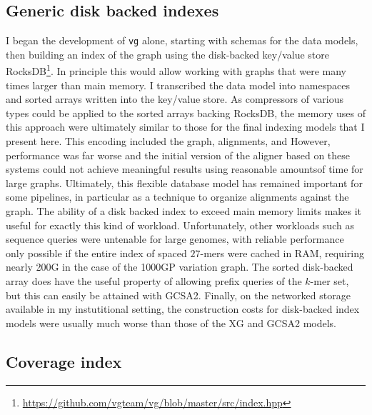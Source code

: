 \subsection{Generic disk backed indexes}
\label{sec:generic_disk_backed_indexes}
I began the development of {\tt vg} alone, starting with schemas for the data models, then building an index of the graph using the disk-backed key/value store RocksDB\footnote{\url{https://github.com/vgteam/vg/blob/master/src/index.hpp}}.
In principle this would allow working with graphs that were many times larger than main memory.
I transcribed the data model into namespaces and sorted arrays written into the key/value store.
As compressors of various types could be applied to the sorted arrays backing RocksDB, the memory uses of this approach were ultimately similar to those for the final indexing models that I present here.
This encoding included the graph, alignments, and 
However, performance was far worse and the initial version of the aligner based on these systems could not achieve meaningful results using reasonable amountsof time for large graphs.
Ultimately, this flexible database model has remained important for some pipelines, in particular as a technique to organize alignments against the graph.
The ability of a disk backed index to exceed main memory limits makes it useful for exactly this kind of workload.
Unfortunately, other workloads such as sequence queries were untenable for large genomes, with reliable performance only possible if the entire index of spaced $27$-mers were cached in RAM, requiring nearly 200G in the case of the 1000GP variation graph.
The sorted disk-backed array does have the useful property of allowing prefix queries of the $k$-mer set, but this can easily be attained with GCSA2.
Finally, on the networked storage available in my instutitional setting, the construction costs for disk-backed index models were usually much worse than those of the XG and GCSA2 models.

\subsection{Coverage index}


